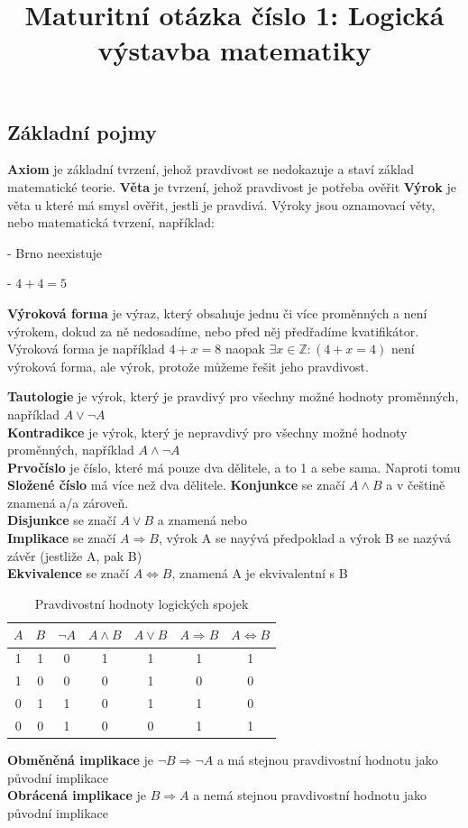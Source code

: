 \documentclass[12pt]{article}
\title{Maturitní otázka číslo 1: Logická výstavba matematiky}
\author{}
\date{}
\begin{document}
\maketitle
\subsection*{Základní pojmy}
\textbf{Axiom} je základní tvrzení, jehož pravdivost se nedokazuje a staví základ matematické teorie.
\textbf{Věta} je tvrzení, jehož pravdivost je potřeba ověřit
\textbf{Výrok} je věta u které má smysl ověřit, jestli je pravdivá. Výroky jsou oznamovací věty, nebo matematická tvrzení, například:

- Brno neexistuje

- $4 + 4 = 5$

\textbf{Výroková forma} je výraz, který obsahuje jednu či více proměnných a není výrokem, dokud za ně nedosadíme, nebo před něj předřadíme kvatifikátor. Výroková forma je například $4 + x = 8$ naopak $\exists x \in \mathbb{Z}:(4 + x = 4)$ není výroková forma, ale výrok, protože můžeme řešit jeho pravdivost.

\textbf{Tautologie} je výrok, který je pravdivý pro všechny možné hodnoty proměnných, například $A \lor \neg A$\\
\textbf{Kontradikce} je výrok, který je nepravdivý pro všechny možné hodnoty proměnných, například $A \land \neg A$\\
\textbf{Prvočíslo} je číslo, které má pouze dva dělitele, a to 1 a sebe sama. Naproti tomu \textbf{Složené číslo} má více než dva dělitele.
\textbf{Konjunkce} se značí $A \land B$ a v češtině znamená a/a zároveň.\\
\textbf{Disjunkce} se značí $A \lor B$ a znamená nebo\\
\textbf{Implikace} se značí $A \Rightarrow B$, výrok A se nayývá předpoklad a výrok B se nazývá závěr (jestliže A, pak B)\\
\textbf{Ekvivalence} se značí $A \Leftrightarrow B$, znamená A je ekvivalentní s B\\

\begin{table}[h]
\centering
\renewcommand{\arraystretch}{1.2}
\begin{tabular}{|c|c|c|c|c|c|c|}
\hline
$A$ & $B$ & $\neg A$ & $A \land B$ & $A \lor B$ & $A \Rightarrow B$ & $A \Leftrightarrow B$ \\
\hline
1 & 1 & 0 & 1 & 1 & 1 & 1 \\
1 & 0 & 0 & 0 & 1 & 0 & 0 \\
0 & 1 & 1 & 0 & 1 & 1 & 0 \\
0 & 0 & 1 & 0 & 0 & 1 & 1 \\
\hline
\end{tabular}
\caption*{Pravdivostní hodnoty logických spojek}
\end{table}
\textbf{Obměněná implikace} je $\neg B \Rightarrow \neg A$ a má stejnou pravdivostní hodnotu jako původní implikace\\
\textbf{Obrácená implikace} je $B \Rightarrow A$ a nemá stejnou pravdivostní hodnotu jako původní implikace\\
\end{document}
